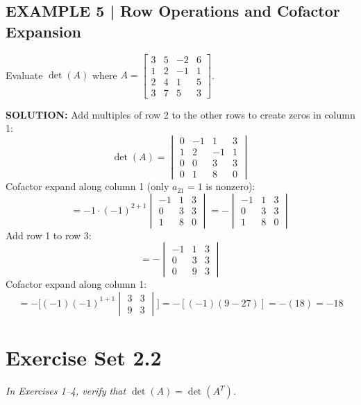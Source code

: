\documentclass{article}
\theoremstyle{mystyle}
\begin{document}
\subsection*{EXAMPLE 5 | Row Operations and Cofactor Expansion}
Evaluate $\det(A)$ where $A=\begin{bmatrix}3&5&-2&6\\1&2&-1&1\\2&4&1&5\\3&7&5&3\end{bmatrix}$.

\textbf{SOLUTION:} Add multiples of row 2 to the other rows to create zeros in column 1:
\[
\det(A)=\begin{vmatrix}0&-1&1&3\\1&2&-1&1\\0&0&3&3\\0&1&8&0\end{vmatrix}
\]
Cofactor expand along column 1 (only $a_{21}=1$ is nonzero):
\[
=-1\cdot(-1)^{2+1}\begin{vmatrix}-1&1&3\\0&3&3\\1&8&0\end{vmatrix}
=-\begin{vmatrix}-1&1&3\\0&3&3\\1&8&0\end{vmatrix}
\]
Add row 1 to row 3:
\[
=-\begin{vmatrix}-1&1&3\\0&3&3\\0&9&3\end{vmatrix}
\]
Cofactor expand along column 1:
\[
=-\bigl[(-1)(-1)^{1+1}\begin{vmatrix}3&3\\9&3\end{vmatrix}\bigr]
=-[(-1)(9-27)]=-(18)=\boxed{-18}
\]

\section*{Exercise Set 2.2}

\noindent\textit{In Exercises 1--4, verify that $\det(A)=\det(A^T)$.}
\end{document}
